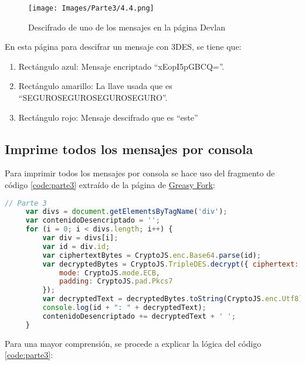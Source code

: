 \documentclass[letter,12pt]{article}
\newcounter{codecount}
\begin{document}
\begin{figure}[H]
    \centering
    \texttt{[image: Images/Parte3/4.4.png]}
    \caption{Descifrado de uno de los mensajes en la página Devlan}
    \label{fig:Devlan}
\end{figure}

En esta página para descifrar un mensaje con 3DES, se tiene que:

\begin{enumerate}
    \item Rectángulo azul: Mensaje encriptado ``xEopI5pGBCQ=''.
    \item Rectángulo amarillo: La llave usada que es ``SEGUROSEGUROSEGUROSEGURO''.

    \item Rectángulo rojo: Mensaje descifrado que es ``este''
\end{enumerate}

\clearpage

\subsection{Imprime todos los mensajes por consola}

Para imprimir todos los mensajes por consola se hace uso del fragmento de código \ref{code:parte3} extraído de la página de \href{https://greasyfork.org/es/scripts/479454-cryptojs/code}{Greasy Fork}:

\label{code:parte3}
\begin{lstlisting}[language=JavaScript, caption={Mostrar mensajes en consola}]
// Parte 3
     var divs = document.getElementsByTagName('div');
     var contenidoDesencriptado = '';
     for (i = 0; i < divs.length; i++) {
         var div = divs[i];
         var id = div.id;
         var ciphertextBytes = CryptoJS.enc.Base64.parse(id);
         var decryptedBytes = CryptoJS.TripleDES.decrypt({ ciphertext: ciphertextBytes }, CryptoJS.enc.Utf8.parse(contrasena), {
             mode: CryptoJS.mode.ECB,
             padding: CryptoJS.pad.Pkcs7
         });
         var decryptedText = decryptedBytes.toString(CryptoJS.enc.Utf8);
         console.log(id + ": " + decryptedText);
         contenidoDesencriptado += decryptedText + ' ';
     }
\end{lstlisting}

Para una mayor comprensión, se procede a explicar la lógica del código \ref{code:parte3}:
\end{document}
